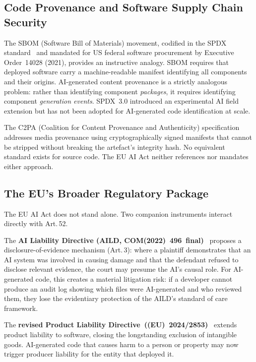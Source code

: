 \documentclass[conference]{IEEEtran}
\begin{document}
\subsection{Code Provenance and Software Supply Chain Security}

The SBOM (Software Bill of Materials) movement, codified in the SPDX
standard~\cite{spdx23} and mandated for US federal software procurement
by Executive Order~14028 (2021), provides an instructive analogy.  SBOM
requires that deployed software carry a machine-readable manifest
identifying all components and their origins.  AI-generated content
provenance is a strictly analogous problem: rather than identifying
component \emph{packages}, it requires identifying component
\emph{generation events}.  SPDX~3.0 introduced an experimental AI field
extension but has not been adopted for AI-generated code identification
at scale.

The C2PA (Coalition for Content Provenance and Authenticity)
specification~\cite{c2pa21} addresses media provenance using
cryptographically signed manifests that cannot be stripped without
breaking the artefact's integrity hash.  No equivalent standard exists
for source code.  The EU AI Act neither references nor mandates either
approach.

\subsection{The EU's Broader Regulatory Package}

The EU AI Act does not stand alone.  Two companion instruments interact
directly with Art.\,52.

The \textbf{AI Liability Directive (AILD, COM(2022)~496~final)}~\cite{aild2022}
proposes a disclosure-of-evidence mechanism (Art.\,3): where a plaintiff
demonstrates that an AI system was involved in causing damage and that
the defendant refused to disclose relevant evidence, the court may
presume the AI's causal role.  For AI-generated code, this creates a
material litigation risk: if a developer cannot produce an audit log
showing which files were AI-generated and who reviewed them, they lose
the evidentiary protection of the AILD's standard of care framework.

The \textbf{revised Product Liability Directive~((EU)~2024/2853)}~\cite{rpld2024}
extends product liability to software, closing the longstanding exclusion
of intangible goods.  AI-generated code that causes harm to a person or
property may now trigger producer liability for the entity that deployed
it.
\end{document}
